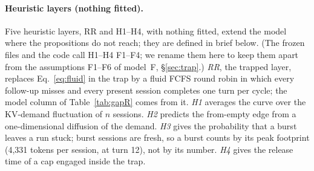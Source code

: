 \paragraph{Heuristic layers (nothing fitted).}\label{sec:fp-heur}
Five heuristic layers, RR and H1--H4, with nothing fitted, extend the model where the propositions do not reach; they are defined in brief below. (The frozen files and the code call H1--H4 F1--F4; we rename them here to keep them apart from the assumptions F1--F6 of model~F, \S\ref{sec:trap}.) \emph{RR}, the trapped layer, replaces Eq.~\eqref{eq:fluid} in the trap by a fluid FCFS round robin in which every follow-up misses and every present session completes one turn per cycle; the model column of Table~\ref{tab:gapR} comes from it. \emph{H1} averages the curve over the KV-demand fluctuation of $n$ sessions. \emph{H2} predicts the from-empty edge from a one-dimensional diffusion of the demand. \emph{H3} gives the probability that a burst leaves a run stuck; burst sessions are fresh, so a burst counts by its peak footprint (4,331 tokens per session, at turn 12), not by its number. \emph{H4} gives the release time of a cap engaged inside the trap.

